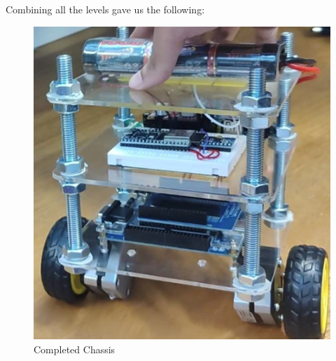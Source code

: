 Combining all the levels gave us the following:


\begin{figure}
    \centering
    \includegraphics[width=0.8\linewidth]{images/final-chassis.png}
    \caption{Completed Chassis}
\end{figure}